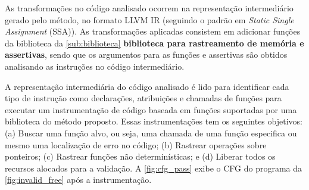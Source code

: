 As transformações no código analisado ocorrem na representação intermediário gerado pelo método, no formato LLVM IR (seguindo o padrão em \textit{Static Single Assignment} (SSA)). 
As transformações aplicadas consistem em adicionar funções da biblioteca da \autoref{sub:biblioteca} \textbf{biblioteca para rastreamento de memória e assertivas}, sendo que os 
argumentos para as funções e assertivas são obtidos analisando as instruções no código intermediário.

\par
A representação intermediária do código analisado é lido 
para identificar cada tipo de instrução como declarações, atribuições e chamadas de funções 
para executar um instrumentação de código baseada em funções suportadas por uma biblioteca do método proposto. 
Essas instrumentações tem os seguintes objetivos: 
(a) Buscar uma função alvo, ou seja, uma chamada de uma função especifica ou mesmo uma localização de erro no código; 
(b) Rastrear operações sobre ponteiros; 
(c) Rastrear funções não determinísticas; e 
(d) Liberar todos os recursos alocados para a validação. 
A \autoref{fig:cfg_pass} exibe o CFG do programa da \autoref{fig:invalid_free} após a instrumentação.


